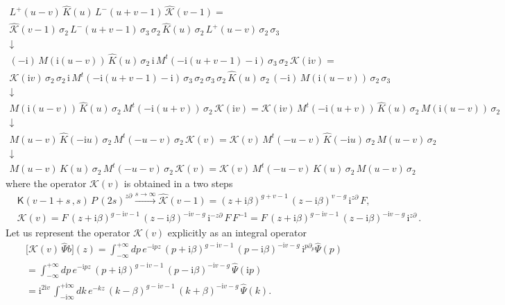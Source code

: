 \documentclass[11pt]{article}
\numberwithin{equation}{section}
\theoremstyle{plain}
\theoremstyle{definition}
\newcommand{\K}{\mathsf{K}}
\renewcommand{\imath}{\mathrm{i}}
\begin{document}
\begin{gather*}
	L^{+}(u-v)\,\hat{K}(u)\,L^{-}(u+v-1)\,\hat{\mathcal{K}}(v-1) = \\
	\hat{\mathcal{K}}(v-1)\,\sigma_2\,L^{-}(u+v-1)\,\sigma_3\,\sigma_2\,
	\hat{K}(u)\,\sigma_2\,L^{+}(u-v)\,\sigma_2\,\sigma_3 \\ 
	\downarrow \\    
	(-\imath)\,M(\imath(u-v))\,\hat{K}(u)\,\sigma_2\,\imath\,M^t(-\imath(u+v-1)-\imath)\,\sigma_3\,\sigma_2\,
	\mathcal{K}(\imath v) = \\
	\mathcal{K}(\imath v)\,\sigma_2\,\sigma_2\,\imath\,M^t(-\imath(u+v-1)-\imath)\,
	\sigma_3\,\sigma_2\,\sigma_3\,\sigma_2\,
	\hat{K}(u)\,\sigma_2\,(-\imath)\,M(\imath(u-v))\,\sigma_2\,\sigma_3 \\ 
	\downarrow \\    
	M(\imath(u-v))\,\hat{K}(u)\,\sigma_2\,M^t(-\imath(u+v))\,\sigma_2\,
	\mathcal{K}(\imath v) = 
	\mathcal{K}(\imath v)\,M^t(-\imath(u+v))\,\hat{K}(u)\,\sigma_2\,M(\imath(u-v))\,\sigma_2 \\ 
	\downarrow \\    
	M(u-v)\,\hat{K}(-\imath u)\,\sigma_2\,M^t(-u-v)\,\sigma_2\,
	\mathcal{K}(v) = 
	\mathcal{K}(v)\,M^t(-u-v)\,
	\hat{K}(-\imath u)\,\sigma_2\,M(u-v)\,\sigma_2 \\ 
	\downarrow \\    
	M(u-v)\,K(u)\,\sigma_2\,M^t(-u-v)\,\sigma_2\,
	\mathcal{K}(v) = 
	\mathcal{K}(v)\,M^t(-u-v)\,
	K(u)\,\sigma_2\,M(u-v)\,\sigma_2
\end{gather*}
where the operator $\mathcal{K}(v)$ is obtained in a two steps 
\begin{align*}
	&\K(v-1+s\,,s)\,P\,(2s)^{z\partial}  
	\xrightarrow{s \to \infty}  \hat{\mathcal{K}}(v-1) = 
	(z+\imath\beta)^{g+v-1}\,(z-\imath\beta)^{v-g}\,
	\imath^{z\partial}\,F,  \\[4pt] 
	&\mathcal{K}(v) =   
	F\,(z+\imath\beta)^{g-\imath v-1}\,(z-\imath\beta)^{-\imath v-g}\,
	\imath^{-z\partial}\,F\,F^{-1} = F\,(z+\imath\beta)^{g-\imath v-1}\,(z-\imath\beta)^{-\imath v-g}\,
	\imath^{z\partial}\,.
\end{align*}
Let us represent the operator $\mathcal{K}(v)$ explicitly as an integral operator  
\begin{align*}
	&\bigl[\mathcal{K}(v)\,\hat{\Psi}b\bigr](z) 
	= \int_{-\infty}^{+\infty} d p\, e^{-\imath p z}\,
	(p+\imath \beta)^{g-\imath v-1}\,(p-\imath \beta)^{-\imath v-g}\,
	\imath^{p\partial_p}\hat{\Psi}(p)  \\ 
	& = \int_{-\infty}^{+\infty} d p\, e^{-\imath p z}\,
	(p+\imath \beta)^{g-\imath v-1}\,(p-\imath\beta)^{-\imath v-g}\,\hat{\Psi}(\imath p) \\ 
	& = \imath^{2\imath v}\,\int_{-\imath\infty}^{+\imath\infty} d k\, e^{-k z}\,
	(k-\beta)^{g-\imath v-1}\,(k+\beta)^{-\imath v-g}\,\hat{\Psi}(k).
\end{align*}
\end{document}

